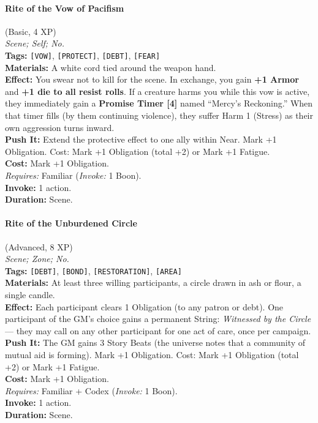 \paragraph{Rite of the Vow of Pacifism} (Basic, 4 XP) \hfill \\
\emph{Scene; Self; No.} \\
\textbf{Tags:} \texttt{[VOW]}, \texttt{[PROTECT]}, \texttt{[DEBT]}, \texttt{[FEAR]} \\
\textbf{Materials:} A white cord tied around the weapon hand. \\
\textbf{Effect:} You swear not to kill for the scene. In exchange, you gain \textbf{+1 Armor} and \textbf{+1 die to all resist rolls}. If a creature harms you while this vow is active, they immediately gain a \textbf{Promise Timer [4]} named ``Mercy's Reckoning.'' When that timer fills (by them continuing violence), they suffer Harm 1 (Stress) as their own aggression turns inward. \\
\textbf{Push It:} Extend the protective effect to one ally within Near. Mark +1 Obligation. Cost: Mark +1 Obligation (total +2) or Mark +1 Fatigue. \\
\textbf{Cost:} Mark +1 Obligation. \\
\textit{Requires:} Familiar (\textit{Invoke:} 1 Boon). \\
\textbf{Invoke:} 1 action. \\
\textbf{Duration:} Scene.

\paragraph{Rite of the Unburdened Circle} (Advanced, 8 XP) \hfill \\
\emph{Scene; Zone; No.} \\
\textbf{Tags:} \texttt{[DEBT]}, \texttt{[BOND]}, \texttt{[RESTORATION]}, \texttt{[AREA]} \\
\textbf{Materials:} At least three willing participants, a circle drawn in ash or flour, a single candle. \\
\textbf{Effect:} Each participant clears 1 Obligation (to any patron or debt). One participant of the GM's choice gains a permanent String: \textit{Witnessed by the Circle} --- they may call on any other participant for one act of care, once per campaign. \\
\textbf{Push It:} The GM gains 3 Story Beats (the universe notes that a community of mutual aid is forming). Mark +1 Obligation. Cost: Mark +1 Obligation (total +2) or Mark +1 Fatigue. \\
\textbf{Cost:} Mark +1 Obligation. \\
\textit{Requires:} Familiar + Codex (\textit{Invoke:} 1 Boon). \\
\textbf{Invoke:} 1 action. \\
\textbf{Duration:} Scene.

